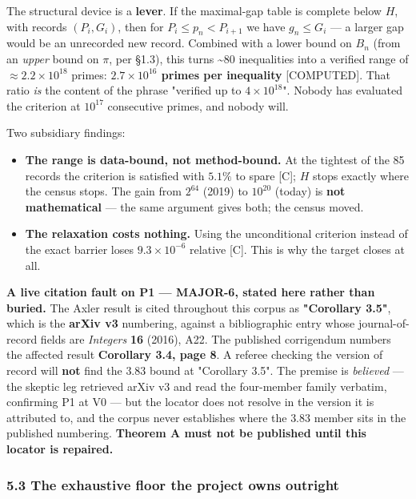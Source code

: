 \documentclass[
  a4paper,
  11pt]{article}
\providecommand{\tightlist}{%
  \setlength{\itemsep}{0pt}\setlength{\parskip}{0pt}}
\begin{document}
The structural device is a \textbf{lever}. If the maximal-gap table is
complete below \(H\), with records \((P_i, G_i)\), then for
\(P_i \le p_n < P_{i+1}\) we have \(g_n \le G_i\) --- a larger gap would
be an unrecorded new record. Combined with a lower bound on \(B_n\)
(from an \emph{upper} bound on \(\pi\), per §1.3), this turns
\textasciitilde80 inequalities into a verified range of
\(\approx 2.2\times10^{18}\) primes: \textbf{\(2.7\times10^{16}\) primes
per inequality} {[}COMPUTED{]}. That ratio \emph{is} the content of the
phrase "verified up to \(4\times10^{18}\)". Nobody has evaluated the
criterion at \(10^{17}\) consecutive primes, and nobody will.

Two subsidiary findings:

\begin{itemize}
\tightlist
\item
  \textbf{The range is data-bound, not method-bound.} At the tightest of
  the 85 records the criterion is satisfied with \(5.1\%\) to spare
  {[}C{]}; \(H\) stops exactly where the census stops. The gain from
  \(2^{64}\) (2019) to \(10^{20}\) (today) is \textbf{not mathematical}
  --- the same argument gives both; the census moved.
\item
  \textbf{The relaxation costs nothing.} Using the unconditional
  criterion instead of the exact barrier loses \(9.3\times10^{-6}\)
  relative {[}C{]}. This is why the target closes at all.
\end{itemize}

\textbf{A live citation fault on P1 --- MAJOR-6, stated here rather than
buried.} The Axler result is cited throughout this corpus as
\textbf{"Corollary 3.5"}, which is the \textbf{arXiv v3} numbering,
against a bibliographic entry whose journal-of-record fields are
\emph{Integers} \textbf{16} (2016), A22. The published corrigendum
numbers the affected result \textbf{Corollary 3.4, page 8}. A referee
checking the version of record will \textbf{not} find the \(3.83\) bound
at "Corollary 3.5". The premise is \emph{believed} --- the skeptic leg
retrieved arXiv v3 and read the four-member family verbatim, confirming
P1 at V0 --- but the locator does not resolve in the version it is
attributed to, and the corpus never establishes where the \(3.83\)
member sits in the published numbering. \textbf{Theorem A must not be
published until this locator is repaired.}

\subsubsection{5.3 The exhaustive floor the project owns
outright}\label{53-the-exhaustive-floor-the-project-owns-outright}
\end{document}
